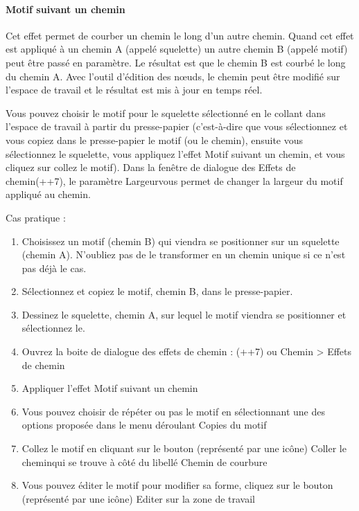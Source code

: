 \documentclass[a4paper,twoside]{article}
\begin{document}
\paragraph{Motif suivant un chemin}
Cet effet permet de courber un chemin le long d'un autre chemin. Quand cet effet est appliqué à un chemin A (appelé squelette) un autre chemin B (appelé motif) peut être passé en paramètre. Le résultat est que le chemin B est courbé le long du chemin A. Avec l'outil d'édition des n\oe uds, le chemin peut être modifié sur l'espace de travail et le résultat est mis à jour en temps réel.

Vous pouvez choisir le motif pour le squelette sélectionné en le collant dans l'espace de travail à partir du presse-papier (c'est-à-dire que vous sélectionnez et vous copiez dans le presse-papier le motif (ou le chemin), ensuite vous sélectionnez le squelette, vous appliquez l'effet \og Motif suivant un chemin\fg, et vous cliquez sur \og collez le motif\fg). Dans la fenêtre de dialogue des \og Effets de chemin\fg  (++7), le paramètre \og Largeur\fg  vous permet de changer la largeur du motif appliqué au chemin.

Cas pratique :
\begin{enumerate}
\item Choisissez un motif (chemin B) qui viendra se positionner sur un squelette (chemin A). N'oubliez pas de le transformer en un chemin unique si ce n'est pas déjà le cas.
\item Sélectionnez et copiez le motif, chemin B, dans le presse-papier.
\item Dessinez le squelette, chemin A, sur lequel le motif viendra se positionner et sélectionnez le.
\item Ouvrez la boite de dialogue des effets de chemin : (++7) ou Chemin > Effets de chemin
\item Appliquer l'effet \og Motif suivant un chemin\fg
\item Vous pouvez choisir de répéter ou pas le motif en sélectionnant une des options proposée dans le menu déroulant \og Copies du motif\fg
\item Collez le motif en cliquant sur le bouton (représenté par une icône) \og Coller le chemin\fg  qui se trouve à côté du libellé \og Chemin de courbure\fg
\item Vous pouvez éditer le motif pour modifier sa forme, cliquez sur le bouton (représenté par une icône) \og Editer sur la zone de travail\fg
\end{enumerate}
\end{document}
